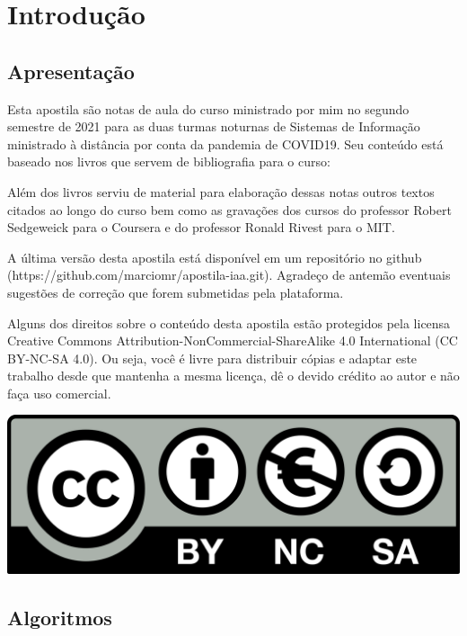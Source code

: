 \chapter{Introdução}

\section{Apresentação}

Esta apostila são notas de aula do curso ministrado por mim no segundo semestre de 2021 para as duas turmas noturnas de Sistemas de Informação ministrado à distância por conta da pandemia de COVID19.
Seu conteúdo está baseado nos livros que servem de bibliografia para o curso:

\nocite{sedgewick01,sedgewick11,cormen12}


\printbibliography[heading=none,keyword={bibliografia}]


  Além dos livros serviu de material para elaboração dessas notas outros textos citados ao longo do curso bem como as gravações dos cursos do professor Robert Sedgeweick para o Coursera e do professor Ronald Rivest para o MIT.

  
  A última versão desta apostila está disponível em um repositório no github (https://github.com/marciomr/apostila-iaa.git).
  Agradeço de antemão eventuais sugestões de correção que forem submetidas pela plataforma.

  Alguns dos direitos sobre o conteúdo desta apostila estão protegidos pela licensa Creative Commons Attribution-NonCommercial-ShareAlike 4.0 International (CC BY-NC-SA 4.0).
Ou seja, você  é livre para distribuir cópias e adaptar este trabalho desde que mantenha a mesma licença, dê o devido crédito ao autor e não faça uso comercial.

\begin{center}
  \includegraphics[width=.3\textwidth]{imagens/cc.png}
\end{center}

\section{Algoritmos}


